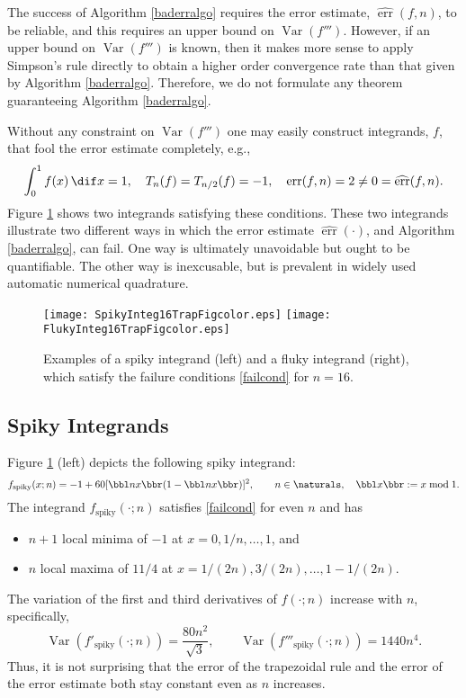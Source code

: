 \documentclass[]{amsart}
\DeclareMathOperator{\Var}{Var}
\DeclareMathOperator{\err}{err}
\newcommand{\herr}{\widehat{\err}}
\theoremstyle{definition}
\theoremstyle{remark}
\begin{document}
The success of Algorithm \ref{baderralgo} requires the error estimate, $\herr(f,n)$, to be reliable, and this requires an upper bound on $\Var(f''')$.  However, if an upper bound on $\Var(f''')$ is known, then it makes more sense to apply Simpson's rule directly to obtain a higher order convergence rate than that given by Algorithm \ref{baderralgo}.  Therefore, we do not formulate any theorem guaranteeing Algorithm \ref{baderralgo}.

Without any constraint on $\Var(f''')$ one may easily construct integrands, $f$, that fool the error estimate completely, e.g.,
\begin{equation} \label{failcond}
\int_0^1 f(x) \, \dif x =  1, \quad T_{n}(f)=T_{n/2}(f) = -1, \quad \err(f,n)=2 \ne 0 = \herr(f,n).
\end{equation}
Figure \ref{spikeflukefig} shows two integrands satisfying these conditions. These two integrands illustrate two different ways in which the error estimate $\herr(\cdot)$, and Algorithm \ref{baderralgo}, can fail.  One way is ultimately unavoidable but ought to be quantifiable.  The other way is inexcusable, but is prevalent in widely used automatic numerical quadrature.

\begin{figure}
\centering 
\texttt{[image: SpikyInteg16TrapFigcolor.eps]} \quad
\texttt{[image: FlukyInteg16TrapFigcolor.eps]}
\caption{Examples of a spiky integrand (left) and a fluky integrand (right), which satisfy the failure conditions \eqref{failcond} for $n=16$. \label{spikeflukefig}}
\end{figure}

\subsection{Spiky Integrands} 

Figure \ref{spikeflukefig} (left) depicts the following spiky integrand:
\begin{equation} \label{spiky}
f_{\text{spiky}}(x;n) = -1 + 60[\bbl nx \bbr(1-\bbl nx \bbr)]^2, \qquad n \in \naturals, \quad \bbl x \bbr := x \bmod 1.
\end{equation}
The integrand $f_{\text{spiky}}(\cdot;n)$ satisfies \eqref{failcond} for even $n$ and has 
\begin{itemize}
\item $n+1$ local minima of $-1$ at $x=0, 1/n, \ldots, 1$, and
\item $n$ local maxima of $11/4$ at $x=1/(2n), 3/(2n), \ldots, 1-1/(2n)$.
\end{itemize}
The variation of the first and third derivatives of $f(\cdot;n)$ increase with $n$, specifically,
\begin{equation*}
\Var(f'_{\text{spiky}}(\cdot;n))= \frac{80n^2}{\sqrt{3}}, \qquad \Var(f'''_{\text{spiky}}(\cdot;n))= 1440n^4.
\end{equation*}
Thus, it is not surprising that the error of the trapezoidal rule and the error of the error estimate both stay constant even as $n$ increases.
\end{document}
